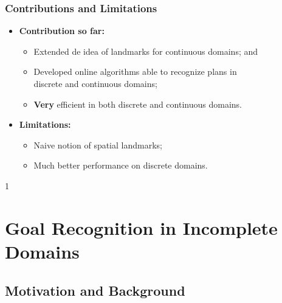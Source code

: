 \documentclass{beamer}
\def\masterclass{1}
\begin{document}
	\begin{frame}[c]\frametitle{Contributions and Limitations}
   	\begin{itemize}
   		\item \textbf{Contribution so far:}
			\begin{itemize}
				\item Extended de idea of landmarks for continuous domains; and
				\item Developed online algorithms able to recognize plans in\\ discrete and continuous domains;
				\item \textbf{Very} efficient in both discrete and continuous domains.
			\end{itemize}
		\item \textbf{Limitations:}
			\begin{itemize}
				\item Naive notion of spatial landmarks;
				\item Much better performance on discrete domains.
			\end{itemize}
	\end{itemize}
	\end{frame}


\if\masterclass1
\section{Goal Recognition in Incomplete Domains}

\subsection{Motivation and Background}
\end{document}
